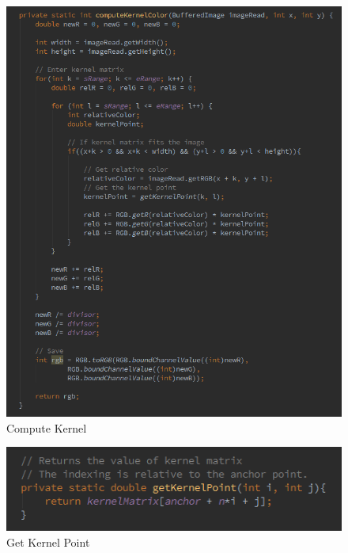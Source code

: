 \documentclass{article}
\begin{document}
\begin{figure}[H]
\centering

  \includegraphics[width=0.9\linewidth]{res/algorithms/computeKernel.png}
  
\caption{Compute Kernel}
\label{fig:alg_compute_kernel}
\end{figure}





\begin{figure}[H]
\centering

  \includegraphics[width=0.9\linewidth]{res/algorithms/getKernelPoint.png}
  
\caption{Get Kernel Point}
\label{fig:alg_getKernelPoint}
\end{figure}


\end{document}
